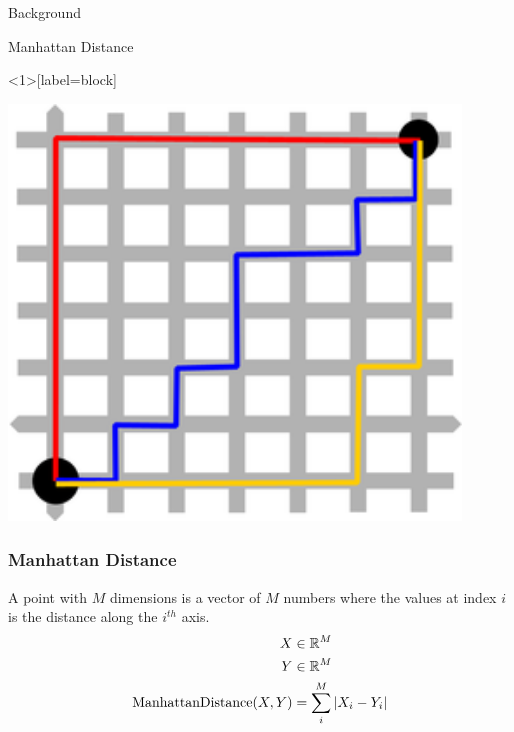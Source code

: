 \documentclass{beamer}
\theoremstyle{case}
\DeclareMathOperator{\md}{Manhattan Distance}
\begin{document}
\begin{section}{Background}
\begin{subsection}{Manhattan Distance}
\begin{frame}<1>[label=block]
    \begin{center}
        \includegraphics[width=0.9\textwidth]{images/manhattan.png}
    \end{center}
\end{frame}


\begin{frame}
    \frametitle{Manhattan Distance}
        A point with $M$ dimensions is a vector of $M$ numbers where the values at index $i$ is the distance along the $i^{th}$ axis.
        \begin{align*}
            X &\in \R^{M} \\
            Y &\in \R^{M} \\
            \md(X, Y) &= \sum_i^M | X_i - Y_i |
        \end{align*}
\end{frame}


\end{subsection}
\end{section}
\end{document}

